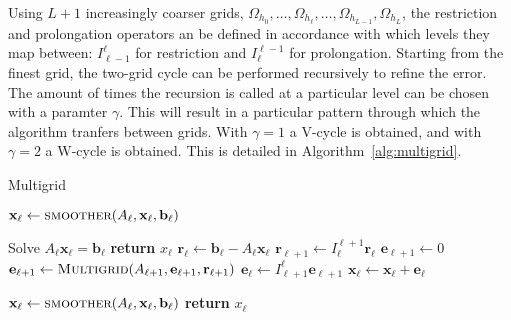Using $L + 1$ increasingly coarser grids, $\Omega_{h_0}, \ldots, \Omega_{h_{\ell}}, \ldots, \Omega_{h_{L-1}}, \Omega_{h_L}$, the restriction and prolongation operators an be defined in accordance with which levels they map between: $I_{\ell-1}^\ell$ for restriction and $I_\ell^{\ell-1}$ for prolongation. Starting from the finest grid, the two-grid cycle can be performed recursively to refine the error. The amount of times the recursion is called at a particular level can be chosen with a paramter $\gamma$. This will result in a particular pattern through which the algorithm tranfers between grids. With $\gamma = 1$ a V-cycle is obtained, and with $\gamma = 2$ a W-cycle is obtained. This is detailed in Algorithm~\ref{alg:multigrid}.

\begin{algorithm}
	\caption{Multigrid}\label{alg:multigrid}
	\begin{algorithmic}[1]
			\State $\mathbf{x}_\ell \gets \Call{smoother}{A_\ell, \mathbf{x}_\ell, \mathbf{b}_\ell}$ 
		\EndFor

			\State Solve $A_\ell \mathbf{x}_\ell = \mathbf{b}_\ell$ 
			\State \textbf{return} $x_\ell$
		\Else
			\State $\mathbf{r}_\ell \gets \mathbf{b}_\ell - A_\ell \mathbf{x}_\ell$ 
			\State $\mathbf{r}_{\ell+1} \gets I_{\ell}^{\ell + 1} \mathbf{r}_\ell$ 
			\State $\mathbf{e}_{\ell+1} \gets 0$
				\State $\mathbf{e}_{\ell+1} \gets \Call{Multigrid}{A_{\ell+1}, \mathbf{e}_{\ell+1}, \mathbf{r}_{\ell+1}}$ 
			\EndFor
			\State $\mathbf{e}_{\ell} \gets I_{\ell + 1}^{\ell} \mathbf{e}_{\ell+1}$ 
			\State $\mathbf{x}_{\ell} \gets \mathbf{x}_{\ell} + \mathbf{e}_{\ell}$ 
		\EndIf

			\State $\mathbf{x}_\ell \gets \Call{smoother}{A_\ell, \mathbf{x}_\ell, \mathbf{b}_\ell}$ 
		\EndFor
		\State \textbf{return} $x_\ell$
		\EndProcedure
	\end{algorithmic}
\end{algorithm}

